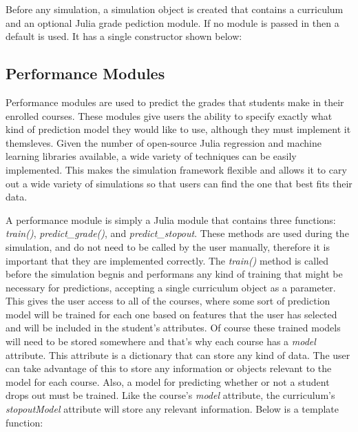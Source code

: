 \documentclass[botnum, fleqn]{unmeethesis}
\begin{document}
Before any simulation, a simulation object is created that contains a curriculum and an optional Julia grade pediction module. If no module is passed in then a default is used. It has a single constructor shown below:



\subsection{Performance Modules}
Performance modules are used to predict the grades that students make in their enrolled courses. These modules give users the ability to specify exactly what kind of prediction model they would like to use, although they must implement it themsleves. Given the number of open-source Julia regression and machine learning libraries available, a wide variety of techniques can be easily implemented. This makes the simulation framework flexible and allows it to cary out a wide variety of simulations so that users can find the one that best fits their data. 

A performance module is simply a Julia module that contains three functions: \textit{train()}, \textit{predict\_grade()}, and \textit{predict\_stopout}. These methods are used during the simulation, and do not need to be called by the user manually, therefore it is important that they are implemented correctly. The \textit{train()} method is called before the simulation begnis and performans any kind of training that might be necessary for predictions, accepting a single curriculum object as a parameter. This gives the user access to all of the courses, where some sort of prediction model will be trained for each one based on features that the user has selected and will be included in the student's attributes. Of course these trained models will need to be stored somewhere and that's why each course has a \textit{model} attribute. This attribute is a dictionary that can store any kind of data. The user can take advantage of this to store any information or objects relevant to the model for each course. Also, a model for predicting whether or not a student drops out must be trained. Like the course's \textit{model} attribute, the curriculum's \textit{stopoutModel} attribute will store any relevant information. Below is a template function:


\end{document}
